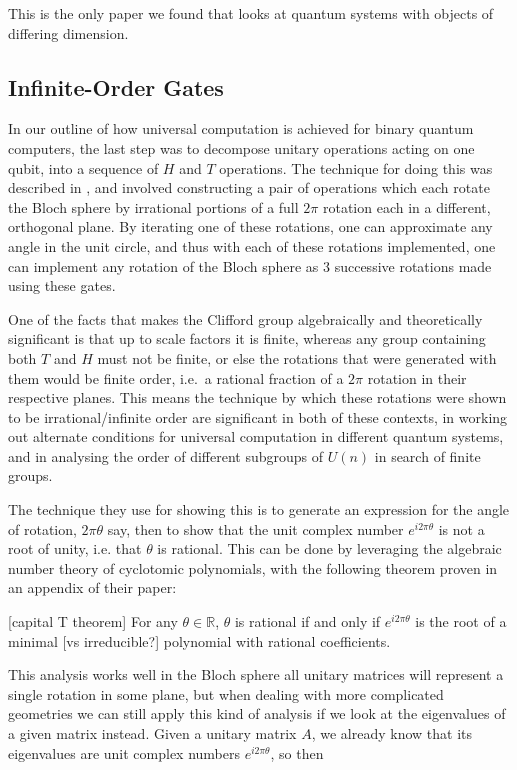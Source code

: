 This is the only paper we found that looks at quantum systems with objects of differing dimension.

\subsection{Infinite-Order Gates}
In our outline of how universal computation is achieved for binary quantum computers, the last step was to decompose unitary operations acting on one qubit, into a sequence of $H$ and $T$ operations. The technique for doing this was described in \cite{universal-qubit}, and involved constructing a pair of operations which each rotate the Bloch sphere by irrational portions of a full $2\pi$ rotation each in a different, orthogonal plane. By iterating one of these rotations, one can approximate any angle in the unit circle, and thus with each of these rotations implemented, one can implement any rotation of the Bloch sphere as 3 successive rotations made using these gates.

One of the facts that makes the Clifford group algebraically and theoretically significant is that up to scale factors it is finite, whereas any group containing both $T$ and $H$ must not be finite, or else the rotations that were generated with them would be finite order, i.e.\ a rational fraction of a $2\pi$ rotation in their respective planes. This means the technique by which these rotations were shown to be irrational/infinite order are significant in both of these contexts, in working out alternate conditions for universal computation in different quantum systems, and in analysing the order of different subgroups of $U(n)$ in search of finite groups.

The technique they use for showing this is to generate an expression for the angle of rotation, $2\pi \theta$ say, then to show that the unit complex number $e^{i2\pi \theta}$ is not a root of unity, i.e. that $\theta$ is rational. This can be done by leveraging the algebraic number theory of cyclotomic polynomials, with the following theorem proven in an appendix of their paper:

[capital T theorem] For any $\theta \in \mathbb{R}$, $\theta$ is rational if and only if $e^{i2\pi \theta}$ is the root of a minimal [vs irreducible?] polynomial with rational coefficients.

This analysis works well in the Bloch sphere all unitary matrices will represent a single rotation in some plane, but when dealing with more complicated geometries we can still apply this kind of analysis if we look at the eigenvalues of a given matrix instead. Given a unitary matrix $A$, we already know that its eigenvalues are unit complex numbers $e^{i 2\pi\theta}$, so then

